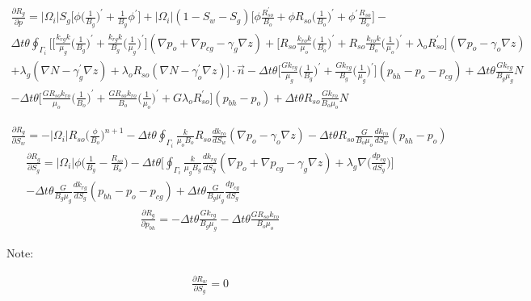 \documentclass[12pt]{article}
\begin{document}
\begin{multline}
\frac{\partial R_g}{\partial p} =  |\Omega_i|S_g\Big[\phi \big(\frac{1}{B_g}\big)^\prime +\frac{1}{B_g}\phi^\prime \Big]+   |\Omega_i|(1-S_w-S_g)\Big[\phi \frac{R^\prime_{so}}{B_o}+ \phi R_{so}\big(\frac{1}{B_o}\big)^\prime +\phi^\prime \frac{R_{so}}{B_o}\Big] - \\
\Delta t\theta\oint_{\Gamma_i}\Bigg[\Big[\frac{k_{rg}k}{\mu_g}\big(\frac{1}{B_g}\big)^\prime+\frac{k_{rg}k}{B_g}\big(\frac{1}{\mu_g}\big)^\prime\Big](\nabla p_o +\nabla p_{cg}-\gamma_g\nabla z)  +\Big[ R_{so}\frac{k_{ro}k}{\mu_o}\big(\frac{1}{B_o}\big)^\prime+R_{so}\frac{k_{ro}k}{B_o}\big(\frac{1}{\mu_o} \big)^\prime+\lambda_oR_{so}^\prime\Big](\nabla p_o -\gamma_o\nabla z)\\
+\lambda_g(\nabla N-\gamma_g^\prime\nabla z) +\lambda_o R_{so}(\nabla N-\gamma_o^\prime\nabla z) \Bigg]\cdot\vec{n} - \Delta t\theta\Big[\frac{Gk_{rg}}{\mu_g}\big(\frac{1}{B_g}\big)^\prime + \frac{Gk_{rg}}{B_g}\big(\frac{1}{\mu_g}\big)^\prime\Big](p_{bh}-p_o-p_{cg})+ \Delta t\theta\frac{Gk_{rg}}{B_g\mu_g}N \\
- \Delta t\theta\Big[\frac{GR_{so}k_{ro}}{\mu_o}\big(\frac{1}{B_o}\big)^\prime + \frac{GR_{so}k_{ro}}{B_o}\big(\frac{1}{\mu_o} \big)^\prime + G\lambda_o R^\prime_{so}\Big](p_{bh}-p_o)+ \Delta t\theta R_{so}\frac{Gk_{ro}}{B_o\mu_o}N
\end{multline}
%

\begin{multline}
\frac{\partial R_g}{\partial S_w} = -|\Omega_i|R_{so}\Big(\frac{\phi }{B_o}\Big)^{n+1}-\Delta t\theta\oint_{\Gamma_i}\frac{k}{\mu_oB_o}R_{so}\frac{d k_{ro}}{d S_w}(\nabla p_o-\gamma_o\nabla z) - \Delta t\theta R_{so}\frac{G}{B_o\mu_o}\frac{dk_{ro}}{dS_w}(p_{bh}-p_o) 	
\end{multline}
%
\begin{multline}
\frac{\partial R_g}{\partial S_g} = |\Omega_i|\phi\Big(\frac{1 }{B_g} -\frac{ R_{so}}{B_o} \Big)- \Delta t\theta\Big[\oint_{\Gamma_i}\frac{k}{\mu_gB_g}\frac{d k_{rg}}{d S_g}(\nabla p_o+\nabla p_{cg}-\gamma_g\nabla z) + \lambda_g\nabla \big(\frac{d  p_{cg}}{dS_g}\big)\Big] \\
- \Delta t\theta \frac{G}{B_g\mu_g}\frac{dk_{rg}}{dS_g}(p_{bh}-p_o-p_{cg})  + \Delta t\theta \frac{G}{B_g\mu_g}\frac{dp_{cg}}{dS_g}	
\end{multline}
%
\begin{multline}
\frac{\partial R_g}{\partial p_{bh}} = -\Delta t\theta\frac{Gk_{rg}}{B_g\mu_g}-\Delta t\theta\frac{G R_{so}k_{ro}}{B_o\mu_o}
\end{multline}

Note:

\begin{multline}
\frac{\partial R_w}{\partial S_g}  = 0
\end{multline}



\end{document}
